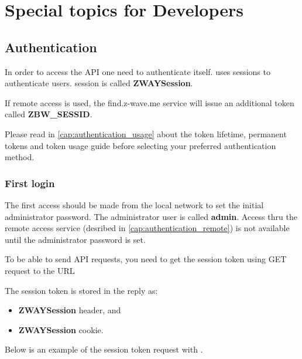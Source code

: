 \chapter{Special topics for Developers}

\section{Authentication}
\label{cap:authentication}

In order to access the API one need to authenticate itself. \zway uses sessions
to authenticate users. \zway session is called \textbf{ZWAYSession}.

If remote access is used, the find.z-wave.me service will issue an additional token called \textbf{ZBW\_SESSID}.

Please read in \ref{cap:authentication_usage} about the token lifetime, permanent tokens and token usage guide before selecting your preferred authentication method.

\subsection{First login}
\label{cap:first_login}

The first access should be made from the local network to set the initial administrator password.
The administrator user is called \textbf{admin}. Access thru the remote access
service (desribed in \ref{cap:authentication_remote}) is not available until the administrator password is set.

To be able to send API requests, you need to get the session token using GET request to the URL 

The session token is stored in the reply as:
\begin{itemize}
\item \textbf{ZWAYSession} header, and
\item \textbf{ZWAYSession} cookie.
\end{itemize}

Below is an example of the session token request with .
{\scriptsize
\begin{quote} 
\end{quote}
}

